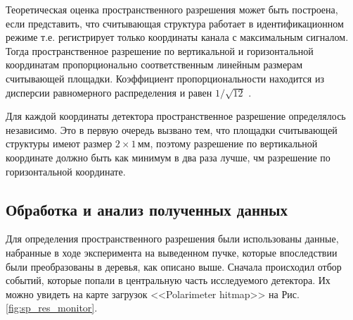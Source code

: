 \par Теоретическая оценка пространственного разрешения может быть построена, если представить, что считывающая структура работает в идентификационном режиме т.е. регистрирует только координаты канала с максимальным сигналом. Тогда пространственное разрешение по вертикальной и горизонтальной координатам пропорционально соответственным линейным размерам считывающей площадки. Коэффициент пропорциональности находится из дисперсии равномерного распределения и равен $1/\sqrt{12}$ \cite{grupen}.
\par Для каждой координаты детектора пространственное разрешение определялось независимо. Это в первую очередь вызвано тем, что площадки считывающей структуры имеют размер $2\times1$\,мм, поэтому разрешение по вертикальной координате должно быть как минимум в два раза лучше, чм разрешение по горизонтальной координате. 

\subsection{Обработка и анализ полученных данных}
Для определения пространственного разрешения были использованы данные, набранные в ходе эксперимента на выведенном пучке, которые впоследствии были преобразованы в деревья, как описано выше. Сначала происходил отбор событий, которые попали в центральную часть исследуемого детектора. Их можно увидеть на карте загрузок <<Polarimeter hitmap>> на Рис. \ref{fig:sp_res_monitor}.

